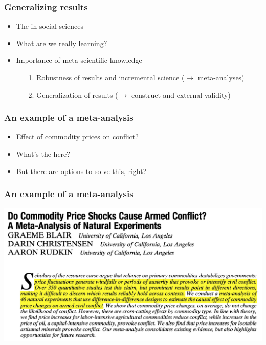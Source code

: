 \documentclass[aspectratio=43]{beamer}
\begin{document}
\begin{frame}
\frametitle{Generalizing results}
\centering

\begin{itemize}
  \item The  in social sciences
  \item What are we really learning?
  \item<2-> Importance of meta-scientific knowledge
  \begin{itemize}
    \item[1.] Robustness of results and incremental science ($\rightarrow$ meta-analyses)
    \item[2.] Generalization of results ($\rightarrow$ construct and external validity)
  \end{itemize}
\end{itemize}

\end{frame}

\begin{frame}
\frametitle{An example of a meta-analysis}
\centering

\begin{itemize}
  \item Effect of commodity prices on conflict?
  \item What's the  here?
  \item<2-> But there are options to solve this, right?
\end{itemize}

\end{frame}

\begin{frame}
\frametitle{An example of a meta-analysis}
\centering

\includegraphics[width = \textwidth]{../img/blair_apsr}

\end{frame}
\end{document}
